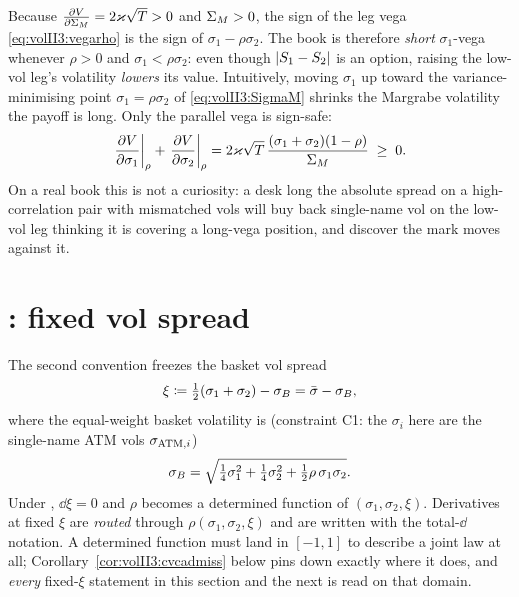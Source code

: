 \begin{remark}\label{rem:volII3:shortvega}
Because $\frac{\partial V}{\partial \Sigma_M} = 2\varkappa\sqrt{T} > 0$ and $\Sigma_M > 0$, the sign of
the leg vega \eqref{eq:volII3:vegarho} is the sign of $\sigma_1 -
\rho\sigma_2$. The book is therefore \emph{short} $\sigma_1$-vega whenever
$\rho > 0$ and $\sigma_1 < \rho\sigma_2$: even though $\lvert S_1 - S_2\rvert$ is an
option, raising the low-vol leg's volatility \emph{lowers} its value.
Intuitively, moving $\sigma_1$ up toward the variance-minimising point
$\sigma_1 = \rho\sigma_2$ of \eqref{eq:volII3:SigmaM} shrinks the Margrabe
volatility the payoff is long. Only the parallel vega is sign-safe:
\begin{equation}\label{eq:volII3:parallelrho}
\left.\frac{\partial V}{\partial \sigma_1}\right|_{\rho} + \left.\frac{\partial V}{\partial \sigma_2}\right|_{\rho}
= 2\varkappa\sqrt{T}\,\frac{(\sigma_1 + \sigma_2)(1 - \rho)}{\Sigma_M} \;\ge\; 0 .
\end{equation}
On a real book this is not a curiosity: a desk long the absolute spread on a
high-correlation pair with mismatched vols will buy back single-name vol on
the low-vol leg thinking it is covering a long-vega position, and discover the
mark moves against it.
\end{remark}

\section{\stickycvc: fixed vol spread}
\label{sec:volII3:stickycvc}

The second convention freezes the basket vol spread
\begin{equation}\label{eq:volII3:xi}
\xi \coloneqq \tfrac12(\sigma_1 + \sigma_2) - \sigma_B = \bar\sigma - \sigma_B,
\end{equation}
where the equal-weight basket volatility is (constraint C1: the $\sigma_i$ here
are the single-name ATM vols $\sigma_{\mathrm{ATM},i}$)
\begin{equation}\label{eq:volII3:sB}
\sigma_B = \sqrt{\tfrac14\sigma_1^2 + \tfrac14\sigma_2^2
          + \tfrac12\rho\,\sigma_1\sigma_2} .
\end{equation}
Under \stickycvc{}, $\dd\xi = 0$ and $\rho$ becomes a determined function of
$(\sigma_1, \sigma_2, \xi)$. Derivatives at fixed $\xi$ are \emph{routed}
through $\rho(\sigma_1, \sigma_2, \xi)$ and are written with the total-$\dd$
notation. A determined function must land in $[-1, 1]$ to describe a joint
law at all; Corollary~\ref{cor:volII3:cvcadmiss} below pins down exactly
where it does, and \emph{every} fixed-$\xi$ statement in this section and the
next is read on that domain.


